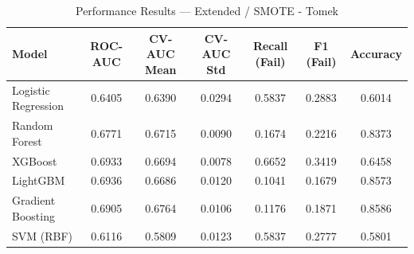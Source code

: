 \begin{table}[htbp]
\caption{Performance Results — Extended / SMOTE - Tomek}
\label{tab:extended_smote_-_tomek}
\begin{tabular}{lcccccc}
\toprule

Model & ROC-AUC & CV-AUC Mean & CV-AUC Std & Recall (Fail) & F1 (Fail) & Accuracy \\
\midrule

Logistic Regression & 0.6405 & 0.6390 & 0.0294 & 0.5837 & 0.2883 & 0.6014 \\
Random Forest & 0.6771 & 0.6715 & 0.0090 & 0.1674 & 0.2216 & 0.8373 \\
XGBoost & 0.6933 & 0.6694 & 0.0078 & 0.6652 & 0.3419 & 0.6458 \\
LightGBM & 0.6936 & 0.6686 & 0.0120 & 0.1041 & 0.1679 & 0.8573 \\
Gradient Boosting & 0.6905 & 0.6764 & 0.0106 & 0.1176 & 0.1871 & 0.8586 \\
SVM (RBF) & 0.6116 & 0.5809 & 0.0123 & 0.5837 & 0.2777 & 0.5801 \\
\bottomrule

\end{tabular}
\end{table}
